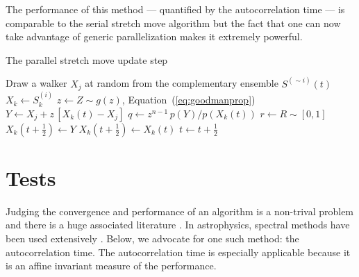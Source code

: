 \documentclass[12pt,preprint]{aastex}
\newcommand{\numberparagraphs}{}
\newcommand{\nonumberparagraphs}{}
\newcommand{\Eq}[1]{Equation~(\ref{eq:#1})}
\newcommand{\eq}[1]{\Eq{#1}}
\newcommand{\sectlabel}[1]{\label{sect:#1}}
\newcommand{\algolabel}[1]{\label{algo:#1}}
\newcommand{\ensemble}{S}
\newcommand{\colorens}[1]{\ensemble^{(#1)}}
\renewcommand{\vector}[1]{#1}
\begin{document}
The performance of this method --- quantified by the autocorrelation time ---
is comparable to the serial stretch move algorithm but the fact that one
can now take advantage of generic parallelization makes it
extremely powerful.

\nonumberparagraphs
\begin{algorithm}
\caption{The parallel stretch move update step
    \algolabel{parallel}}
\begin{algorithmic}[1]
     \label{line:parallelloop}
        \STATE Draw a walker $\vector{X_j}$ at random from the complementary %
            ensemble $\colorens{\sim i} (t)$
        \STATE $\vector{X_k} \gets \colorens{i}_k$
        \STATE $z \gets Z \sim g(z)$, \Eq{goodmanprop}
        \STATE $\vector{Y} \gets \vector{X_j}
                + z \, [ \vector{X_k} (t) - \vector{X_j}]$
        \STATE $q \gets z^{n-1} \, p(\vector{Y})/p(\vector{X}_k(t))$
        \STATE $r \gets R \sim [0, 1]$
        \IF{$r \ge q$, \eq{acceptance}}
            \STATE $\vector{X_k} (t+\frac{1}{2}) \gets \vector{Y}$
        \ELSE
            \STATE $\vector{X_k} (t+\frac{1}{2}) \gets \vector{X_k}(t)$
        \ENDIF
    \ENDFOR
    \STATE $t \gets t+\frac{1}{2}$
\ENDFOR

\end{algorithmic}
\end{algorithm}
\numberparagraphs

\section{Tests} \sectlabel{tests}

Judging the convergence and performance of an algorithm is a
non-trival problem and there is a huge associated literature
\citep[see, for example,][for a review]{Cowles:1996}. In astrophysics,
spectral methods have been used extensively \citep[for
example][]{Dunkley:2005}. Below, we advocate for one such method: the
autocorrelation time. The autocorrelation time is especially applicable
because it is an affine invariant measure of the performance.
\end{document}
